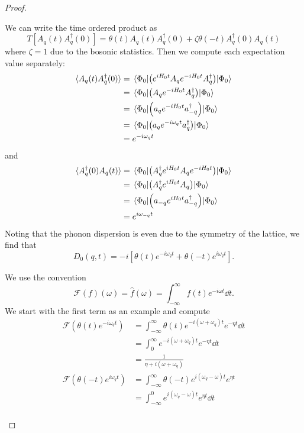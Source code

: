 \begin{proof}
	\begin{parts}
	\item We can write the time ordered product as
		\[
			T[A_q(t)A_q^\dagger(0)] = \theta(t)A_q(t)A_q^\dagger(0)+\zeta\theta(-t)A_q^\dagger(0)A_q(t)
		\] 
		where $\zeta=1$ due to the bosonic statistics. Then we compute each expectation value separately:
		\begin{align*}
			\langle A_q(t)A_q^\dagger(0)\rangle &= \mel{\Phi_0}{\left( e^{iH_0t}A_qe^{-iH_0t}A_q^\dagger \right)}{\Phi_0}  \\
 &= \mel{\Phi_0}{\left( A_qe^{-iH_0t}A_q^\dagger \right)}{\Phi_0}  \\
 &= \mel{\Phi_0}{\left( a_qe^{-iH_0t}a_{-q}^\dagger \right)}{\Phi_0}  \\
 &= \mel{\Phi_0}{\left( a_qe^{-i\omega_{q}t}a_{q}^\dagger \right)}{\Phi_0}  \\
 &= e^{-i\omega_q t} 
		\end{align*}
		and
		\begin{align*}
			\langle A_q^\dagger(0) A_q(t)\rangle &=  \mel{\Phi_0}{\left(A_q^\dagger e^{iH_0t} A_q e^{-iH_0t}  \right)}{\Phi_0}  \\
 &=  \mel{\Phi_0}{\left(A_q^\dagger e^{iH_0t} A_q  \right)}{\Phi_0}  \\
 &=  \mel{\Phi_0}{\left(a_{-q} e^{iH_0t} a_{-q}^\dagger  \right)}{\Phi_0}  \\
 &= e^{i \omega_{-q}t} 
		\end{align*}
Noting that the phonon dispersion is even due to the symmetry of the lattice, we find that
\[
	D_0(q, t) = -i[\theta(t)e^{-i\omega_q t} + \theta(-t)e^{i\omega_qt}]
.\] 
\item We use the convention
	\[
		\mathcal{F}(f)(\omega) = \hat{f}(\omega) = \int_{-\infty}^\infty f(t)e^{-i\omega t}\dd{t}
	.\] 
	We start with the first term as an example and compute
	\begin{align*}
		\mathcal{F}{\left( \theta(t)e^{-i\omega_qt} \right) }&= \int_{-\infty}^\infty \theta(t)e^{-i(\omega+\omega_q )t}e^{-\eta t}\dd{t} \\
							      &= \int_0^\infty e^{-i(\omega+\omega_q)t}e^{-\eta t}\dd{t} \\
							     &= \frac{1}{\eta + i(\omega+\omega_q)}\\
		\mathcal{F}\left( \theta(-t)e^{i\omega_q t} \right) &= \int_{-\infty}^\infty \theta(-t) e^{i(\omega_q-\omega)t}e^{\eta t} \\
								    &= \int_{-\infty}^0 e^{i(\omega_q-\omega)t} e^{\eta t}\dd{t} \\

\end{align*}
\end{parts}
\end{proof}
